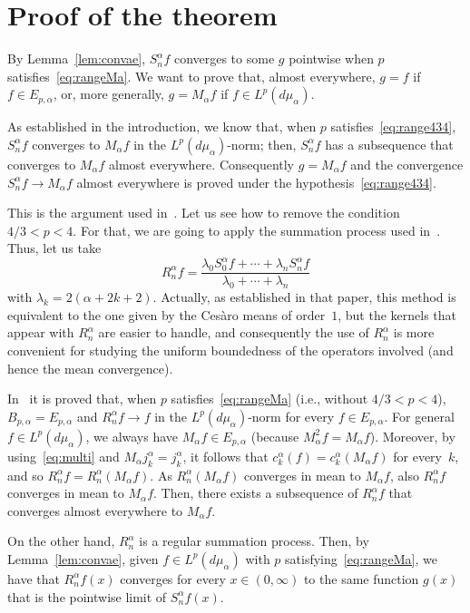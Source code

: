 \documentclass[10pt,a4paper]{article}
\newcommand{\ma}{M_{\alpha}}
\newcommand{\mua}{d\mu_\alpha}
\newcommand{\jka}{j_k^{\alpha}}
\newcommand{\cka}{c_k^{\alpha}}
\newcommand{\Sna}{S_n^{\alpha}}
\newcommand{\Rna}{R_n^{\alpha}}
\theoremstyle{plain}
\begin{document}
\section{Proof of the theorem}

By Lemma~\ref{lem:convae}, $\Sna f$ converges to some $g$ pointwise when $p$ satisfies~\eqref{eq:rangeMa}. We want to prove that, almost everywhere, $g = f$ if $f \in E_{p,\alpha}$,
or, more generally, $g = \ma f$ if $f \in L^p(\mua)$.

As established in the introduction, we know that, when $p$ satisfies~\eqref{eq:range434}, $\Sna f$ converges to $\ma f$ in the $L^p(\mua)$-norm; then, $\Sna f$ has a subsequence that converges to $\ma f$  almost everywhere. Consequently $g = \ma f$ and the convergence $\Sna f \to \ma f$ almost everywhere is proved under the hypothesis~\eqref{eq:range434}.

This is the argument used in~\cite{CiGPV}. Let us see how to remove the condition $4/3 < p < 4$. For that, we are going to apply the summation process used in~\cite{CiStV}.
Thus, let us take
$$
  \Rna f = \frac{\lambda_0 S_0^{\alpha}f + \cdots
  + \lambda_n \Sna f}{\lambda_0 + \cdots + \lambda_n}
$$
with $\lambda_k = 2(\alpha+2k+2)$. Actually, as established in that paper, this method is equivalent to the one given by the Ces\`aro means of order~$1$, but the kernels that appear with $\Rna$ are easier to handle, and consequently the use of $\Rna$ is more convenient for studying the uniform boundedness of the operators involved (and hence the mean convergence). 

In~\cite{CiStV} it is proved that, when $p$ satisfies~\eqref{eq:rangeMa} (i.e., without $4/3 < p < 4$), $B_{p,\alpha} = E_{p,\alpha}$ and $\Rna f \to f$ in the $L^p(\mua)$-norm for every $f \in E_{p,\alpha}$. For general $f \in L^p(\mua)$, we always have $\ma f \in E_{p,\alpha}$ (because $\ma^2 f = \ma f$). Moreover, by using~\eqref{eq:multi} and $\ma \jka = \jka$, it follows that $\cka(f) = \cka(\ma f)$ for every~$k$, and so $\Rna f = \Rna(\ma f)$. As $\Rna(\ma f)$ converges in mean to $\ma f$, also $\Rna f$ converges in mean to $\ma f$. Then, there exists a subsequence of $\Rna f$ that converges almost everywhere to $\ma f$.

On the other hand, $\Rna$ is a regular summation process. Then, by Lemma~\ref{lem:convae}, given $f \in L^p(\mua)$ with $p$ satisfying~\eqref{eq:rangeMa}, we have that $\Rna f(x)$ converges for every $x \in (0,\infty)$ to the same function $g(x)$ that is the pointwise limit of $\Sna f(x)$. 
\end{document}
